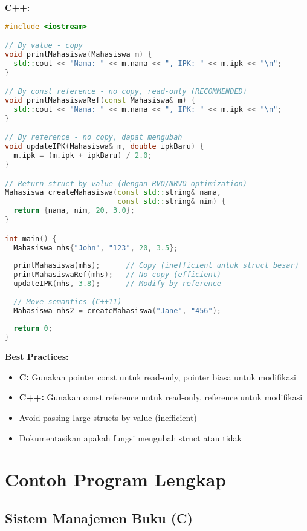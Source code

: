\documentclass[../main.tex]{subfiles}
\begin{document}
\textbf{C++:}
\begin{lstlisting}[language=C++, caption={Passing struct di C++}]
#include <iostream>

// By value - copy
void printMahasiswa(Mahasiswa m) {
  std::cout << "Nama: " << m.nama << ", IPK: " << m.ipk << "\n";
}

// By const reference - no copy, read-only (RECOMMENDED)
void printMahasiswaRef(const Mahasiswa& m) {
  std::cout << "Nama: " << m.nama << ", IPK: " << m.ipk << "\n";
}

// By reference - no copy, dapat mengubah
void updateIPK(Mahasiswa& m, double ipkBaru) {
  m.ipk = (m.ipk + ipkBaru) / 2.0;
}

// Return struct by value (dengan RVO/NRVO optimization)
Mahasiswa createMahasiswa(const std::string& nama, 
                          const std::string& nim) {
  return {nama, nim, 20, 3.0};
}

int main() {
  Mahasiswa mhs{"John", "123", 20, 3.5};
  
  printMahasiswa(mhs);      // Copy (inefficient untuk struct besar)
  printMahasiswaRef(mhs);   // No copy (efficient)
  updateIPK(mhs, 3.8);      // Modify by reference
  
  // Move semantics (C++11)
  Mahasiswa mhs2 = createMahasiswa("Jane", "456");
  
  return 0;
}
\end{lstlisting}

\textbf{Best Practices:}
\begin{itemize}
  \item \textbf{C:} Gunakan pointer const untuk read-only, pointer biasa untuk modifikasi
  \item \textbf{C++:} Gunakan const reference untuk read-only, reference untuk modifikasi
  \item Avoid passing large structs by value (inefficient)
  \item Dokumentasikan apakah fungsi mengubah struct atau tidak
\end{itemize}

\section{Contoh Program Lengkap}

\subsection{Sistem Manajemen Buku (C)}
\end{document}
